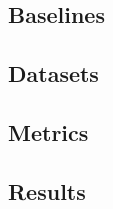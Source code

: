 \documentclass[../main.tex]{subfiles}
\begin{document}







\subsection{Baselines}

\subsection{Datasets}

\subsection{Metrics}


\subsection{Results}
\end{document}
